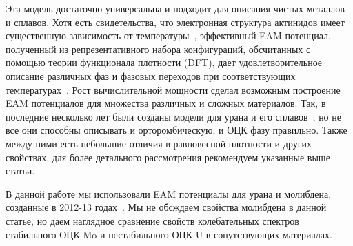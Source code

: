 \documentclass[master,14pt,subf,href,colorlinks=true
]{disser}
\begin{document}
Эта модель достаточно универсальна и подходит для описания чистых металлов и сплавов. Хотя есть свидетельства, что электронная структура актинидов имеет существенную зависимость от температуры~\cite{Soderlind_1995}, эффективный EAM-потенциал, полученный из репрезентативного набора конфигураций, обсчитанных с помощью теории функционала плотности (DFT), дает удовлетворительное описание различных фаз и фазовых переходов при соответствующих температурах~\cite{U_SSS_2012}.
Рост вычислительной мощности сделал возможным построение EAM потенциалов для множества различных и сложных материалов. Так, в последние несколько лет были созданы модели для урана и его сплавов~\cite{U_SSS_2012,U_Mo_Xe_2013,U_MEAM_Beeler, U_MEAM_Argentine, U-Zr,ortho-U}, но не все они способны описывать и орторомбическую, и ОЦК фазу правильно. Также между ними есть небольшие отличия в равновесной плотности и других свойствах, для более детального рассмотрения рекомендуем указанные выше статьи.


В данной работе мы использовали EAM потенциалы для урана и молибдена, созданные в 2012-13 годах~\cite{U_SSS_2012,U_Mo_Xe_2013}. Мы не обсждаем свойства молибдена в данной статье, но даем наглядное сравнение свойств колебательных спектров стабильного ОЦК-Mo и нестабильного ОЦК-U в сопутствующих материалах.
\end{document}
